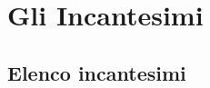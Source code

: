 \section{Gli Incantesimi}

\begin{multicols}{2}



\subsection{Elenco incantesimi}

\end{multicols}

